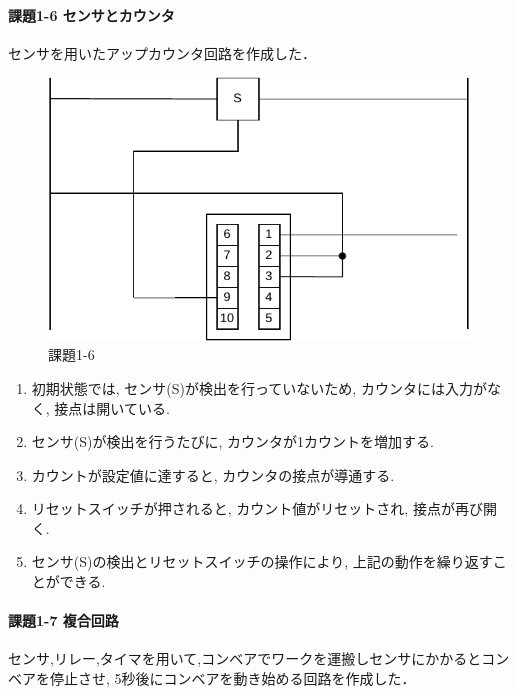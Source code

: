 \paragraph{課題1-6 センサとカウンタ}
センサを用いたアップカウンタ回路を作成した．

\begin{figure}[H]
  \centering
  \includegraphics[scale=0.7]{sozai/19.pdf}
  \caption{課題1-6}
\end{figure}
\begin{enumerate}
  \item 初期状態では, センサ(S)が検出を行っていないため, カウンタには入力がなく, 接点は開いている.
  \item センサ(S)が検出を行うたびに, カウンタが1カウントを増加する.
  \item カウントが設定値に達すると, カウンタの接点が導通する.
  \item リセットスイッチが押されると, カウント値がリセットされ, 接点が再び開く.
  \item センサ(S)の検出とリセットスイッチの操作により, 上記の動作を繰り返すことができる.
\end{enumerate}



\paragraph{課題1-7 複合回路}
センサ,リレー,タイマを用いて,コンベアでワークを運搬しセンサにかかるとコンベアを停止させ,
5秒後にコンベアを動き始める回路を作成した．

